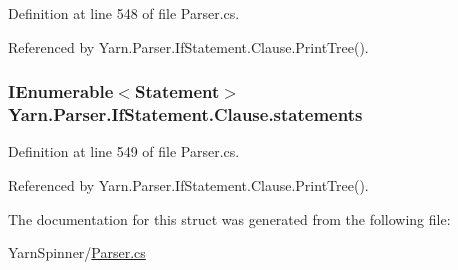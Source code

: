 Definition at line 548 of file Parser.\-cs.



Referenced by Yarn.\-Parser.\-If\-Statement.\-Clause.\-Print\-Tree().

\hypertarget{a00052_a6f4765482e98ed042e38a0ede13f171f}{
\subsubsection[{statements}]{\setlength{\rightskip}{0pt plus 5cm}I\-Enumerable$<${\bf Statement}$>$ Yarn.\-Parser.\-If\-Statement.\-Clause.\-statements\hspace{0.3cm}{\ttfamily [package]}}}\label{a00052_a6f4765482e98ed042e38a0ede13f171f}


Definition at line 549 of file Parser.\-cs.



Referenced by Yarn.\-Parser.\-If\-Statement.\-Clause.\-Print\-Tree().



The documentation for this struct was generated from the following file\-:\begin{DoxyCompactItemize}
\item 
Yarn\-Spinner/\hyperlink{a00316}{Parser.\-cs}\end{DoxyCompactItemize}
